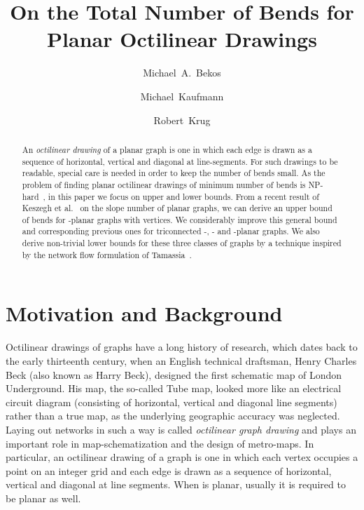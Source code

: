 \documentclass[a4paper,twoside,11pt]{article}
\begin{document}
 
\title{On the Total Number of Bends for Planar Octilinear Drawings}
\author[1]{Michael~A.~Bekos}
\author[1]{Michael~Kaufmann}
\author[1]{Robert~Krug}
\date{}
\newtheorem{lemma}{Lemma}
\newtheorem{theorem}{Theorem}
\newtheorem{definition}{Definition}


\maketitle

\begin{abstract}
An \emph{octilinear drawing} of a planar graph is one in which each
edge is drawn as a sequence of horizontal, vertical and diagonal at
 line-segments. For such drawings to be readable, special
care is needed in order to keep the number of bends small. As the
problem of finding planar octilinear drawings of minimum number of
bends is NP-hard~\cite{Noellenburg05}, in this paper we focus on
upper and lower bounds. From a recent result of Keszegh et
al.~\cite{KPP13} on the slope number of planar graphs, we can derive
an upper bound of   bends for -planar graphs with 
vertices. We considerably improve this general bound and
corresponding previous ones for triconnected -, - and
-planar graphs. We also derive non-trivial lower bounds for these
three classes of graphs by a technique inspired by the network flow
formulation of Tamassia~\cite{Tamassia87}.
\end{abstract}



\section{Motivation and Background}
\label{sec:introduction}


Octilinear drawings of graphs have a long history of research, which
dates back to the early thirteenth century, when an English technical
draftsman, Henry Charles Beck (also known as Harry Beck), designed
the first schematic map of London Underground. His map, the so-called
Tube map, looked more like an electrical circuit diagram (consisting
of horizontal, vertical and diagonal line segments) rather than a
true map, as the underlying geographic accuracy was neglected. Laying
out networks in such a way is called \emph{octilinear graph drawing}
and plays an important role in map-schematization and the design of
metro-maps. In particular, an octilinear drawing  of a
graph  is one in which each vertex occupies a point on an
integer grid and each edge is drawn as a sequence of horizontal,
vertical and diagonal at  line segments. When  is
planar, usually it is required  to be planar as well.
\end{document}
